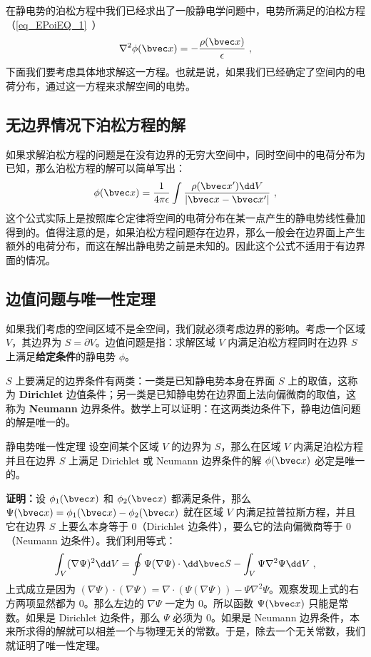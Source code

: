 

在静电势的泊松方程中我们已经求出了一般静电学问题中，电势所满足的泊松方程（\autoref{eq_EPoiEQ_1}~）
\begin{align}
\nabla^2 \phi(\bvec x)=-\frac{\rho(\bvec x)}{\epsilon}~,
\end{align}
下面我们要考虑具体地求解这一方程。也就是说，如果我们已经确定了空间内的电荷分布，通过这一方程来求解空间的电势。
\subsection{无边界情况下泊松方程的解}
如果求解泊松方程的问题是在没有边界的无穷大空间中，同时空间中的电荷分布为已知，那么泊松方程的解可以简单写出：
\begin{align}
\phi(\bvec x)=\frac{1}{4\pi \epsilon}\int \frac{\rho (\bvec x')\dd V}{|\bvec x-\bvec x'|}~,
\end{align}
这个公式实际上是按照库仑定律将空间的电荷分布在某一点产生的静电势线性叠加得到的。值得注意的是，如果泊松方程问题存在边界，那么一般会在边界面上产生额外的电荷分布，而这在解出静电势之前是未知的。因此这个公式不适用于有边界面的情况。

\subsection{边值问题与唯一性定理}
如果我们考虑的空间区域不是全空间，我们就必须考虑边界的影响。考虑一个区域 $V$，其边界为 $S=\partial V$。边值问题是指：求解区域 $V$ 内满足泊松方程同时在边界 $S$ 上满足\textbf{给定条件}的静电势 $\phi$。

$S$ 上要满足的边界条件有两类：一类是已知静电势本身在界面 $S$
上的取值，这称为 \textbf{Dirichlet} 边值条件；另一类是已知静电势在边界面上法向偏微商的取值，这称为 \textbf{Neumann} 边界条件。数学上可以证明：在这两类边条件下，静电边值问题的解是唯一的。
\begin{theorem}{静电势唯一性定理}\label{the_empoi_1}
设空间某个区域 $V$ 的边界为 $S$，那么在区域 $V$ 内满足泊松方程并且在边界 $S$ 上满足 Dirichlet 或 Neumann 边界条件的解 $\phi(\bvec x)$ 必定是唯一的。
\end{theorem}
\textbf{证明：}设 $\phi_1(\bvec x)$ 和 $\phi_2(\bvec x)$ 都满足条件，那么 $\Psi(\bvec x)=\phi_1(\bvec x)-\phi_2(\bvec x)$ 就在区域 $V$ 内满足拉普拉斯方程，并且它在边界 $S$ 上要么本身等于 $0$（Dirichlet 边条件），要么它的法向偏微商等于 $0$（Neumann 边条件）。我们利用等式：
\begin{align}
\int_V (\nabla \Psi)^2 \dd V=\oint \Psi(\nabla \Psi)\cdot \dd \bvec S - \int_V \Psi \nabla^2\Psi \dd V~,
\end{align}
上式成立是因为 $(\nabla \Psi)\cdot (\nabla \Psi)=\nabla\cdot (\Psi(\nabla\Psi))-\Psi\nabla^2\Psi$。观察发现上式的右方两项显然都为 $0$。那么左边的 $\nabla\Psi$ 一定为 $0$。所以函数 $\Psi(\bvec x)$ 只能是常数。如果是 Dirichlet 边条件，那么 $\Psi$ 必须为 $0$。如果是 Neumann 边界条件，本来所求得的解就可以相差一个与物理无关的常数。于是，除去一个无关常数，我们就证明了唯一性定理。

